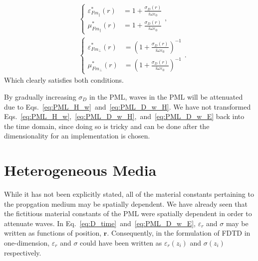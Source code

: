 \documentclass[12pt,twocolumn]{article}
\begin{document}
\begin{subequations}
\begin{align}
&\left\{
\begin{aligned}
\varepsilon_{Fm_\parallel}^*(r)&=1+\frac{\sigma_{D}(r)}{i\omega\varepsilon_0}\\
\mu_{Fm_\parallel}^*(r)&=1+\frac{\sigma_{D}(r)}{i\omega\varepsilon_0}
\end{aligned}\right.,\\
&\left\{
\begin{aligned}
\varepsilon_{Fm_\perp}^*(r)&=\left(1+\frac{\sigma_{D}(r)}{i\omega\varepsilon_0}\right)^{-1}\\
\mu_{Fm_\perp}^*(r)&=\left(1+\frac{\sigma_{D}(r)}{i\omega\varepsilon_0}\right)^{-1}
\end{aligned}\right..
\end{align}
\end{subequations}
Which clearly satisfies both conditions.

By gradually increasing $\sigma_{D}$ in the PML, waves in the PML will be attenuated due to Eqs.~\ref{eq:PML_H_w}~and~\ref{eq:PML_D_w_H}. We have not transformed Eqs.~\ref{eq:PML_H_w},~\ref{eq:PML_D_w_H},~and~\ref{eq:PML_D_w_E} back into the time domain, since doing so is tricky and can be done after the dimensionality for an implementation is chosen.

\section{Heterogeneous Media}
While it has not been explicitly stated, all of the material constants pertaining to the propgation medium may be spatially dependent. We have already seen that the fictitious material constants of the PML were spatially dependent in order to attenuate waves. In Eq.~\ref{eq:D_time}~and~\ref{eq:PML_D_w_E}, $\varepsilon_r$ and $\sigma$ may be written as functions of position, $\mathbf{r}$. Consequently, in the formulation of FDTD in one-dimension, $\varepsilon_r$ and $\sigma$ could have been written as $\varepsilon_r(z_i)$ and $\sigma(z_i)$ respectively.
\end{document}
